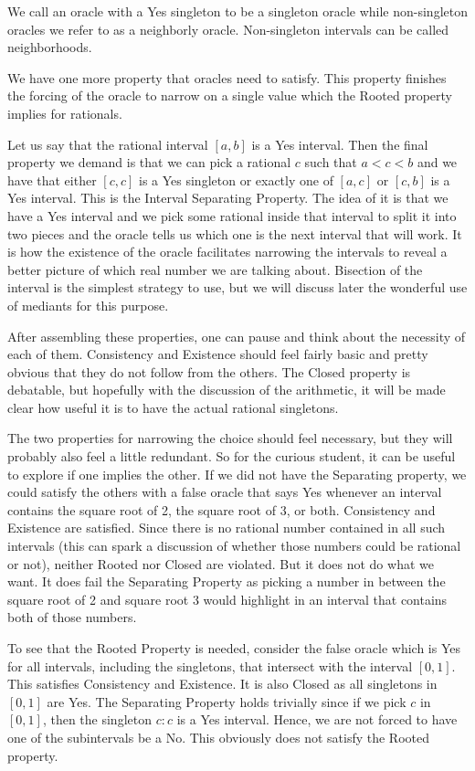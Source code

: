 \documentclass[12pt]{article}
\theoremstyle{remark}
\begin{document}
We call an oracle with a Yes singleton to be a singleton oracle while non-singleton oracles we refer to as a neighborly oracle. Non-singleton intervals can be called neighborhoods. 

We have one more property that oracles need to satisfy. This property finishes the forcing of the oracle to narrow on a single value which the Rooted property implies for rationals. 

Let us say that the rational interval $[a, b]$ is a Yes interval. Then the final property we demand is that we can pick a rational $c$ such that $a < c <b$ and we have that either $[c,c]$ is a Yes singleton or exactly one of $[a,c]$ or $[c,b]$ is a Yes interval. This is the Interval Separating Property. The idea of it is that we have a Yes interval and we pick some rational inside that interval to split it into two pieces and the oracle tells us which one is the next interval that will work. It is how the existence of the oracle facilitates narrowing the intervals to reveal a better picture of which real number we are talking about. Bisection of the interval is the simplest strategy to use, but we will discuss later the wonderful use of mediants for this purpose. 

After assembling these properties, one can pause and think about the necessity of each of them. Consistency and Existence should feel fairly basic and pretty obvious that they do not follow from the others. The Closed property is debatable, but hopefully with the discussion of the arithmetic, it will be made clear how useful it is to have the actual rational singletons.  

The two properties for narrowing the choice should feel necessary, but they will probably also feel a little redundant. So for the curious student, it can be useful to explore if one implies the other. If we did not have the Separating property, we could satisfy the others with a false oracle that says Yes whenever an interval contains the square root of 2, the square root of 3, or both. Consistency and Existence are satisfied. Since there is no rational number contained in all such intervals (this can spark a discussion of whether those numbers could be rational or not), neither Rooted nor Closed are violated. But it does not do what we want. It does fail the Separating Property as picking a number in between the square root of 2 and square root 3 would highlight in an interval that contains both of those numbers.  

To see that the Rooted Property is needed, consider the false oracle which is Yes for all intervals, including the singletons, that intersect with the interval $[0,1]$. This satisfies Consistency and Existence. It is also Closed as all singletons in $[0,1]$ are Yes. The Separating Property holds trivially since if we pick $c$ in $[0,1]$, then the singleton $c:c$ is a Yes interval. Hence, we are not forced to have one of the subintervals be a No. This obviously does not satisfy the Rooted property. 
\end{document}
